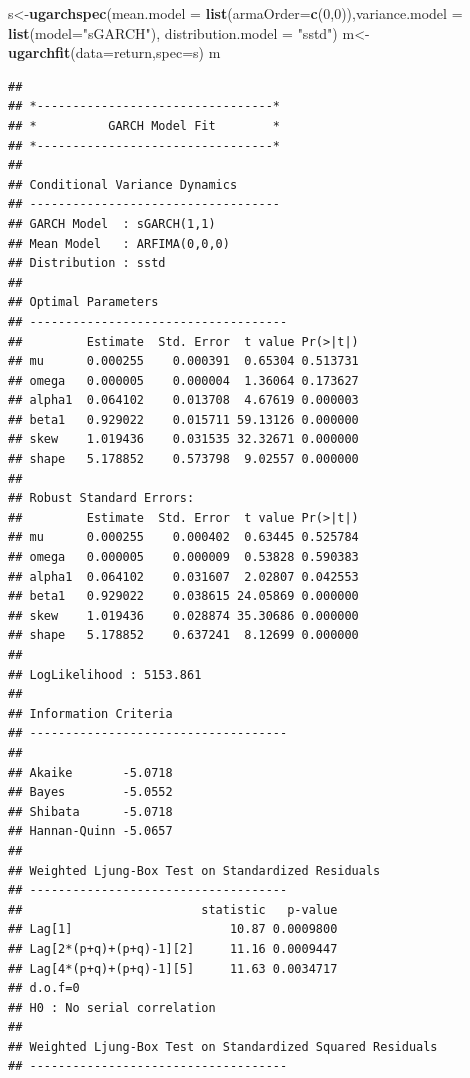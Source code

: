\documentclass[
  12pt,
  a4paper,
  openany]{book}
\newenvironment{Shaded}{\begin{snugshade}}{\end{snugshade}}
\newcommand{\DataTypeTok}[1]{\textcolor[rgb]{0.13,0.29,0.53}{#1}}
\newcommand{\DecValTok}[1]{\textcolor[rgb]{0.00,0.00,0.81}{#1}}
\newcommand{\KeywordTok}[1]{\textcolor[rgb]{0.13,0.29,0.53}{\textbf{#1}}}
\newcommand{\NormalTok}[1]{#1}
\newcommand{\StringTok}[1]{\textcolor[rgb]{0.31,0.60,0.02}{#1}}
\begin{document}
\begin{Shaded}
\begin{Highlighting}[]
\NormalTok{s\textless{}{-}}\KeywordTok{ugarchspec}\NormalTok{(}\DataTypeTok{mean.model =} \KeywordTok{list}\NormalTok{(}\DataTypeTok{armaOrder=}\KeywordTok{c}\NormalTok{(}\DecValTok{0}\NormalTok{,}\DecValTok{0}\NormalTok{)),}\DataTypeTok{variance.model =} \KeywordTok{list}\NormalTok{(}\DataTypeTok{model=}\StringTok{"sGARCH"}\NormalTok{),}
              \DataTypeTok{distribution.model =} \StringTok{"sstd"}\NormalTok{)}
\NormalTok{m\textless{}{-}}\KeywordTok{ugarchfit}\NormalTok{(}\DataTypeTok{data=}\NormalTok{return,}\DataTypeTok{spec=}\NormalTok{s)}
\NormalTok{m}
\end{Highlighting}
\end{Shaded}

\begin{verbatim}
## 
## *---------------------------------*
## *          GARCH Model Fit        *
## *---------------------------------*
## 
## Conditional Variance Dynamics    
## -----------------------------------
## GARCH Model  : sGARCH(1,1)
## Mean Model   : ARFIMA(0,0,0)
## Distribution : sstd 
## 
## Optimal Parameters
## ------------------------------------
##         Estimate  Std. Error  t value Pr(>|t|)
## mu      0.000255    0.000391  0.65304 0.513731
## omega   0.000005    0.000004  1.36064 0.173627
## alpha1  0.064102    0.013708  4.67619 0.000003
## beta1   0.929022    0.015711 59.13126 0.000000
## skew    1.019436    0.031535 32.32671 0.000000
## shape   5.178852    0.573798  9.02557 0.000000
## 
## Robust Standard Errors:
##         Estimate  Std. Error  t value Pr(>|t|)
## mu      0.000255    0.000402  0.63445 0.525784
## omega   0.000005    0.000009  0.53828 0.590383
## alpha1  0.064102    0.031607  2.02807 0.042553
## beta1   0.929022    0.038615 24.05869 0.000000
## skew    1.019436    0.028874 35.30686 0.000000
## shape   5.178852    0.637241  8.12699 0.000000
## 
## LogLikelihood : 5153.861 
## 
## Information Criteria
## ------------------------------------
##                     
## Akaike       -5.0718
## Bayes        -5.0552
## Shibata      -5.0718
## Hannan-Quinn -5.0657
## 
## Weighted Ljung-Box Test on Standardized Residuals
## ------------------------------------
##                         statistic   p-value
## Lag[1]                      10.87 0.0009800
## Lag[2*(p+q)+(p+q)-1][2]     11.16 0.0009447
## Lag[4*(p+q)+(p+q)-1][5]     11.63 0.0034717
## d.o.f=0
## H0 : No serial correlation
## 
## Weighted Ljung-Box Test on Standardized Squared Residuals
## ------------------------------------

\end{verbatim}
\end{document}
